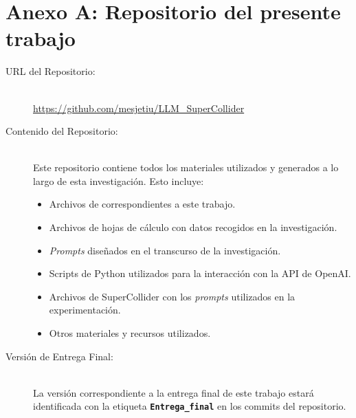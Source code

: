 \chapter*{Anexo A: Repositorio del presente trabajo}
\label{anexo:repositorio}

\begin{center}
\end{center}

\begin{description}
    \item[URL del Repositorio:] \hfill \\
    \url{https://github.com/mesjetiu/LLM_SuperCollider}
    
    \item[Contenido del Repositorio:] \hfill \\
    Este repositorio contiene todos los materiales utilizados y generados a lo largo de esta investigación. Esto incluye:
    \begin{itemize}
        \item Archivos de  correspondientes a este trabajo.
        \item Archivos de hojas de cálculo con datos recogidos en la investigación.
        \item \textit{Prompts} diseñados en el transcurso de la investigación.
        \item Scripts de Python utilizados para la interacción con la API de OpenAI.
        \item Archivos de SuperCollider con los \textit{prompts} utilizados en la experimentación.
        \item Otros materiales y recursos utilizados.
    \end{itemize}
    
    \item[Versión de Entrega Final:] \hfill \\
    La versión correspondiente a la entrega final de este trabajo estará identificada con la etiqueta \textbf{\texttt{Entrega\_final}} en los commits del repositorio.

\end{description}



